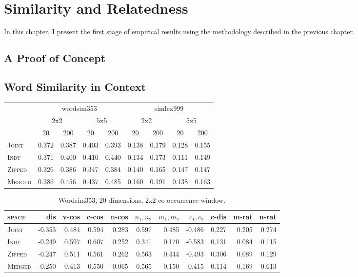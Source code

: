 \chapter{Similarity and Relatedness}
In this chapter, I present the first stage of empirical results using the methodology described in the previous chapter.

\section{A Proof of Concept}

\section{Word Similarity in Context}

\begin{table}
\begin{tabular}{lrrrr|rrrr}
\hline
& \multicolumn{4}{c|}{wordsim353} & \multicolumn{4}{c}{simlex999} \\
& \multicolumn{2}{c}{2x2} & \multicolumn{2}{c|}{5x5} & \multicolumn{2}{c}{2x2} & \multicolumn{2}{c}{5x5} \\
& \multicolumn{1}{c}{20} & \multicolumn{1}{c}{200} & \multicolumn{1}{c}{20} & \multicolumn{1}{c|}{200} & \multicolumn{1}{c}{20} & \multicolumn{1}{c}{200} & \multicolumn{1}{c}{20} & \multicolumn{1}{c}{200} \\
\hline
\textsc{Joint} & 0.372 & 0.387 & 0.403 & 0.393 & 0.138 & 0.179 & 0.128 & 0.155 \\
\textsc{Indy} & 0.371 & 0.400 & 0.410 & 0.440 & 0.134 & 0.173 & 0.111 & 0.149 \\
\textsc{Zipped} & 0.326 & 0.386 & 0.347 & 0.384 & 0.140 & 0.165 & 0.147 & 0.147 \\
\textsc{Merged} & 0.386 & 0.456 & 0.437 & 0.485 & 0.160 & 0.191 & 0.138 & 0.163 \\
\hline
\end{tabular}
\end{table}

\begin{table}
\begin{tabular}{lrrrrrrrrrr}
\hline
\textsc{space} & dis & v-cos & c-cos & n-cos & $n_1,n_2$ & $m_1,m_2$ & $c_1,c_2$ & c-dis & m-rat & n-rat \\
\hline
\textsc{Joint} & -0.353 & 0.484 & 0.594 & 0.283 & 0.597 & 0.485 & -0.486 & 0.227 & 0.205 & 0.274 \\
\textsc{Indy} & -0.249 & 0.597 & 0.607 & 0.252 & 0.341 & 0.170 & -0.583 & 0.131 & 0.084 & 0.115 \\
\textsc{Zipped} & -0.247 & 0.511 & 0.561 & 0.262 & 0.563 & 0.444 & -0.493 & 0.306 & 0.089 & 0.129 \\
\textsc{Merged} & -0.250 & 0.413 & 0.550 & -0.065 & 0.565 & 0.150 & -0.415 & 0.114 & -0.169 & 0.613 \\
\hline
\end{tabular}
\caption{Wordsim353, 20 dimensions, 2x2 co-occurrence window.}
\end{table}

